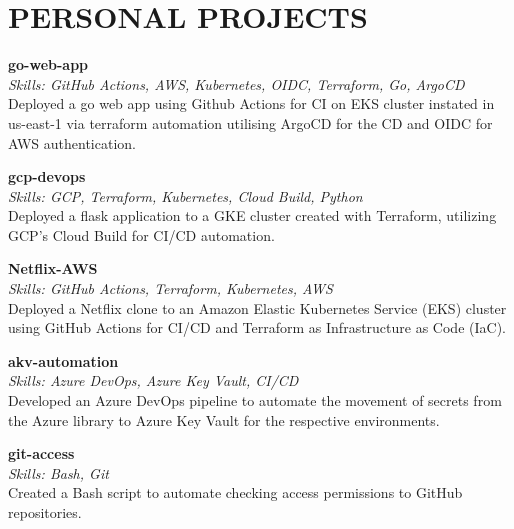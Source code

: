\documentclass[11pt,a4paper]{article}
\begin{document}
\section*{PERSONAL PROJECTS}
\noindent\textbf{go-web-app}\\
\textit{Skills: GitHub Actions, AWS, Kubernetes, OIDC, Terraform, Go, ArgoCD}\\
Deployed a go web app using Github Actions for CI on EKS cluster instated in us-east-1 via terraform automation utilising ArgoCD for the CD and OIDC for AWS authentication.
\vspace{0.5em}

\noindent\textbf{gcp-devops}\\
\textit{Skills: GCP, Terraform, Kubernetes, Cloud Build, Python}\\
Deployed a flask application to a GKE cluster created with Terraform, utilizing GCP's Cloud Build for CI/CD automation.
\vspace{0.5em}

\noindent\textbf{Netflix-AWS}\\
\textit{Skills: GitHub Actions, Terraform, Kubernetes, AWS}\\
Deployed a Netflix clone to an Amazon Elastic Kubernetes Service (EKS) cluster using GitHub Actions for CI/CD and Terraform as Infrastructure as Code (IaC).
\vspace{0.5em}

\noindent\textbf{akv-automation}\\
\textit{Skills: Azure DevOps, Azure Key Vault, CI/CD}\\
Developed an Azure DevOps pipeline to automate the movement of secrets from the Azure library to Azure Key Vault for the respective environments.
\vspace{0.5em}

\noindent\textbf{git-access}\\
\textit{Skills: Bash, Git}\\
Created a Bash script to automate checking access permissions to GitHub repositories.
\end{document}
